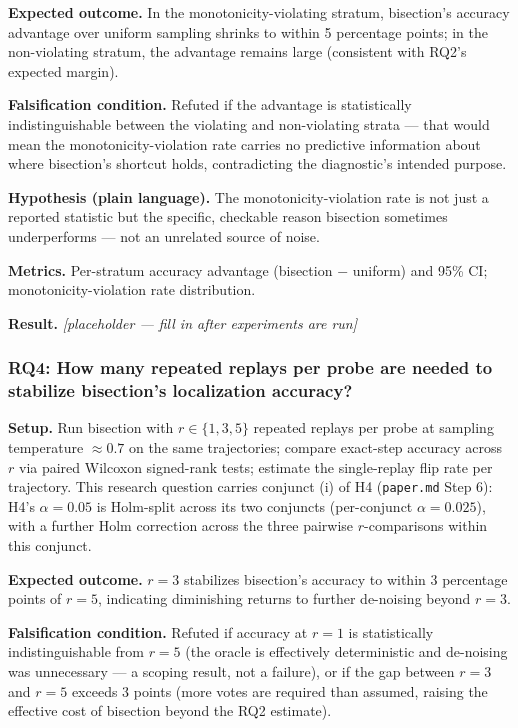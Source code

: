 \documentclass[11pt]{article}
\newcommand{\ph}{\textit{[placeholder --- fill in after experiments are run]}}
\begin{document}
\textbf{Expected outcome.} In the monotonicity-violating stratum, bisection's accuracy advantage over uniform sampling shrinks to within 5 percentage points; in the non-violating stratum, the advantage remains large (consistent with RQ2's expected margin).

\textbf{Falsification condition.} Refuted if the advantage is statistically indistinguishable between the violating and non-violating strata --- that would mean the monotonicity-violation rate carries no predictive information about where bisection's shortcut holds, contradicting the diagnostic's intended purpose.

\textbf{Hypothesis (plain language).} The monotonicity-violation rate is not just a reported statistic but the specific, checkable reason bisection sometimes underperforms --- not an unrelated source of noise.

\textbf{Metrics.} Per-stratum accuracy advantage (bisection $-$ uniform) and 95\% CI; monotonicity-violation rate distribution.

\textbf{Result.} \ph

\subsubsection{RQ4: How many repeated replays per probe are needed to stabilize bisection's localization accuracy?}
\textbf{Setup.} Run bisection with $r \in \{1,3,5\}$ repeated replays per probe at sampling temperature $\approx 0.7$ on the same trajectories; compare exact-step accuracy across $r$ via paired Wilcoxon signed-rank tests; estimate the single-replay flip rate per trajectory. This research question carries conjunct (i) of H4 (\texttt{paper.md} Step 6): H4's $\alpha=0.05$ is Holm-split across its two conjuncts (per-conjunct $\alpha=0.025$), with a further Holm correction across the three pairwise $r$-comparisons within this conjunct.

\textbf{Expected outcome.} $r=3$ stabilizes bisection's accuracy to within 3 percentage points of $r=5$, indicating diminishing returns to further de-noising beyond $r=3$.

\textbf{Falsification condition.} Refuted if accuracy at $r=1$ is statistically indistinguishable from $r=5$ (the oracle is effectively deterministic and de-noising was unnecessary --- a scoping result, not a failure), or if the gap between $r=3$ and $r=5$ exceeds 3 points (more votes are required than assumed, raising the effective cost of bisection beyond the RQ2 estimate).
\end{document}
